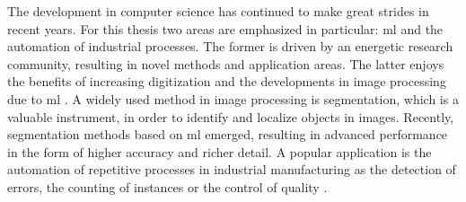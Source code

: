 

The development in computer science has continued to make great strides in recent years. 
For this thesis two areas are emphasized in particular: \gls{ml} and the automation of industrial processes.
The former is driven by an energetic research community, resulting in novel methods and application areas.
The latter enjoys the benefits of increasing digitization and the developments in image processing due to \gls{ml} .
A widely used method in image processing is segmentation, which is a valuable instrument, in order to identify and localize objects in images.
Recently, segmentation methods based on \gls{ml} emerged, resulting in advanced performance in the form of higher accuracy and richer detail.
A popular application is the automation of repetitive processes in industrial manufacturing as the detection of errors, the counting of instances or the control of quality \cite{Rah19-IoT} \cite{Chen19-AnomalyDetectionManufacturing}.

